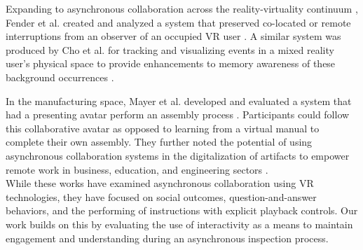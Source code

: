 Expanding to asynchronous collaboration across the reality-virtuality continuum \cite{Milgram_RealityVirtuality1995}, Fender et al. created and analyzed a system that preserved co-located or remote interruptions from an observer of an occupied VR user \cite{Fender_CausalityAsync2022}.
A similar system was produced by Cho et al. for tracking and visualizing events in a mixed reality user's physical space to provide enhancements to memory awareness of these background occurrences \cite{Cho_RealityReplay2023}.

In the manufacturing space, Mayer et al. developed and evaluated a system that had a presenting avatar perform an assembly process \cite{Mayer_AsyncManualWork2022}.
Participants could follow this collaborative avatar as opposed to learning from a virtual manual to complete their own assembly.
They further noted the potential of using asynchronous collaboration systems in the digitalization of artifacts to empower remote work in business, education, and engineering sectors \cite{Mayer_CollaborativeWorkImmersive2023}.\\

\noindent While these works have examined asynchronous collaboration using VR technologies, they have focused on social outcomes, question-and-answer behaviors, and the performing of instructions with explicit playback controls.
Our work builds on this by evaluating the use of interactivity as a means to maintain engagement and understanding during an asynchronous inspection process.

